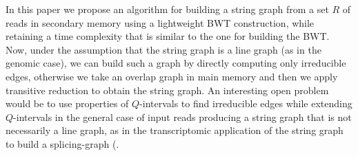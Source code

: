 \documentclass[runningheads,envcountsame,a4paper]{llncs}
\begin{document}
In this paper we propose an algorithm for building a string graph from a set $R$ of reads in secondary memory using a lightweight BWT construction, while retaining 
a time complexity that  is similar to the one for building the BWT.
Now, under the assumption that the string graph is a line graph  (as in the genomic case), we can build such a graph by directly computing only irreducible edges, otherwise
we take an overlap graph in main memory and then we apply transitive reduction to obtain the string graph.
An interesting open problem would be to use properties of $Q$-intervals to find irreducible edges while extending $Q$-intervals in the general case of input reads producing a string graph that is not necessarily a line graph, as in the transcriptomic application of the string graph to build a splicing-graph (\cite{Berettaet al}.


\end{document}
